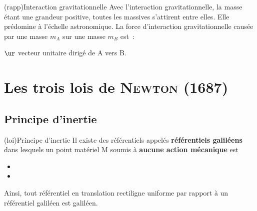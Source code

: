 \documentclass[../../main/main.tex]{subfiles}
\begin{document}
\begin{tcb}(rapp){Interaction gravitationnelle}
	Avec l'interaction gravitationnelle, la masse étant une grandeur positive,
	toutes les massives s'attirent entre elles. Elle prédomine à l'échelle
	astronomique.
	\smallbreak
	La force d'interaction gravitationnelle causée par une masse
	$m_A$ sur une masse $m_B$ est~:
	\smallbreak
	\begin{isd}
		\psw{%
			\[
				\Ff_{g,\rm A\ra B} = -\Gc \frac{m_Am_B}{\rm AB^2}\ur
				\qavec
				\ur = \frac{\vv{\rm AB}}{\rm AB}
			\]
		}%
		$\ur$ vecteur unitaire dirigé de A vers B.
		\tcblower
		\begin{center}
			\vspace{-15pt}
		\end{center}
	\end{isd}
\end{tcb}

\section{Les trois lois de \textsc{Newton} (1687)}
\subsection{Principe d'inertie}

\begin{tcb*}(loi){Principe d'inertie}
	Il existe des référentiels appelés \textbf{référentiels galiléens} dans
	lesquels un point matériel M soumis à \textbf{aucune action mécanique} est
	\begin{itemize}
		\item {}
		\item {}
	\end{itemize}
	Ainsi, tout référentiel en translation rectiligne uniforme par rapport à un
	référentiel galiléen est galiléen.
\end{tcb*}
\end{document}
